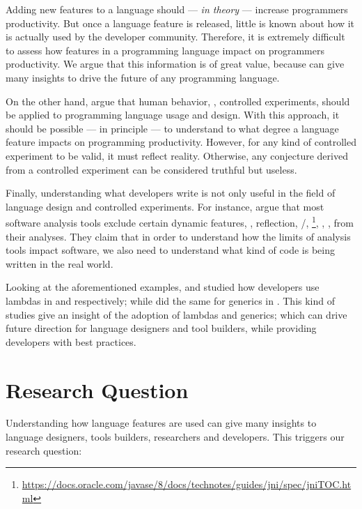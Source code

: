 

Adding new features to a language should --- \emph{in theory} --- increase programmers productivity.
But once a language feature is released, little is known about how it is actually used by the developer community.
Therefore, it is extremely difficult to assess how features in a programming language impact on programmers productivity.
We argue that this information is of great value, because can give many insights to drive the future of any programming language.

On the other hand, \cite{hanenberg_faith_2010,hanenberg_why_2014} argue that human behavior, \ie{}, controlled experiments, should be applied to programming language usage and design.
With this approach, it should be possible --- in principle --- to understand to what degree a language feature impacts on programming productivity.
However, for any kind of controlled experiment to be valid, it must reflect reality.
Otherwise, any conjecture derived from a controlled experiment can be considered truthful but useless.

Finally, understanding what developers write is not only useful in the field of language design and controlled experiments.
For instance, \cite{livshits_defense_2015} argue that most software analysis tools exclude certain dynamic features, \eg{}, reflection, \setjmp{}/\longjmp{}, \jni \footnote{\url{https://docs.oracle.com/javase/8/docs/technotes/guides/jni/spec/jniTOC.html}}, \eval{}, \etc{}, from their analyses.
They claim that in order to understand how the limits of analysis tools impact software, we also need to understand what kind of code is being written in the real world.

Looking at the aforementioned examples, \cite{mazinanian_understanding_2017} and \cite{uesbeck_empirical_2016} studied how developers use lambdas in \java{} and \cpp{} respectively; while \cite{parnin_java_2011,parnin_adoption_2013} did the same for generics in \java{}.
This kind of studies give an insight of the adoption of lambdas and generics; which can drive future direction for language designers and tool builders, while providing developers with best practices.

\section{Research Question}
\label{sec:orgb16a4cf}
Understanding how language features are used can give many insights to language designers, tools builders, researchers and developers.
This triggers our research question:


